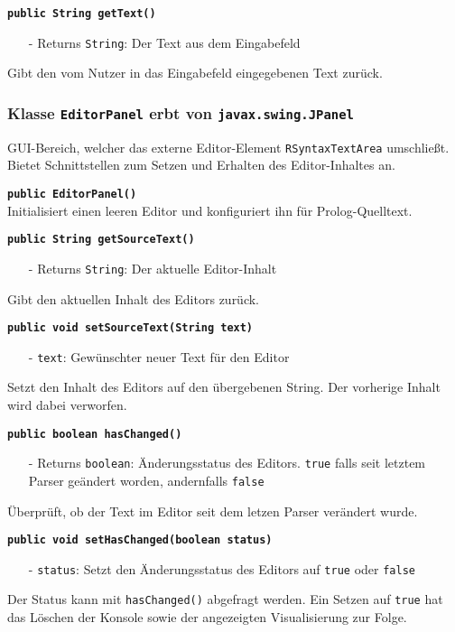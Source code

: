\documentclass[parskip=full,11pt,twoside]{scrartcl}
\begin{document}
\textbf{\texttt{public String getText()}}
\begin{itemize}[noitemsep]
	\item[-] Returns \texttt{String}: Der Text aus dem Eingabefeld
\end{itemize}
Gibt den vom Nutzer in das Eingabefeld eingegebenen Text zurück.

\subsubsection{Klasse \texttt{EditorPanel} erbt von \texttt{javax.swing.JPanel}}

GUI-Bereich, welcher das externe Editor-Element \texttt{RSyntaxTextArea} umschließt. Bietet Schnittstellen zum Setzen und Erhalten des Editor-Inhaltes an.

\textbf{\texttt{public EditorPanel()}}\\
Initialisiert einen leeren Editor und konfiguriert ihn für Prolog-Quelltext.

\textbf{\texttt{public String getSourceText()}}
\begin{itemize}[noitemsep]
	\item[-] Returns \texttt{String}: Der aktuelle Editor-Inhalt
\end{itemize}
Gibt den aktuellen Inhalt des Editors zurück.

\textbf{\texttt{public void setSourceText(String text)}}
\begin{itemize}[noitemsep]
	\item[-] \texttt{text}: Gewünschter neuer Text für den Editor
\end{itemize}
Setzt den Inhalt des Editors auf den übergebenen String. Der vorherige Inhalt wird dabei verworfen.

\textbf{\texttt{public boolean hasChanged()}}
\begin{itemize}[noitemsep]
	\item[-] Returns \texttt{boolean}: Änderungsstatus des Editors. \texttt{true} falls seit letztem Parser geändert worden, andernfalls \texttt{false}
\end{itemize}
Überprüft, ob der Text im Editor seit dem letzen Parser verändert wurde.

\textbf{\texttt{public void setHasChanged(boolean status)}}
\begin{itemize}[noitemsep]
	\item[-] \texttt{status}: Setzt den Änderungsstatus des Editors auf \texttt{true} oder \texttt{false}
\end{itemize}
Der Status kann mit \texttt{hasChanged()} abgefragt werden. Ein Setzen auf \texttt{true} hat das Löschen der Konsole sowie der angezeigten Visualisierung zur Folge.
\end{document}
